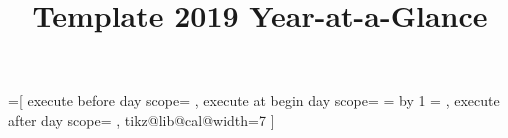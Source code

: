 \documentclass{article}
\begin{document}
  \title{\vspace{-1cm}Template 2019 Year-at-a-Glance\vspace{-1cm}}
  \date{}
  \author{}

  \maketitle
  \thispagestyle{empty} %
  \makeatletter


  =[
      execute before day scope={%
      },
      execute at begin day scope={%
          \pgfmathsetlength\pgf@x{\tikz@lib@cal@xshift}%
          \ifnum{}
          \else
              \c@pgf@counta=\pgfcalendarcurrentweekday
              \advance\c@pgf@counta by 1
          \fi
          \pgf@x=\c@pgf@counta\pgf@x
          \pgftransformxshift{\pgf@x}
      },
      execute after day scope={
      },
      tikz@lib@cal@width=7
  ]

  \makeatother
\end{document}
